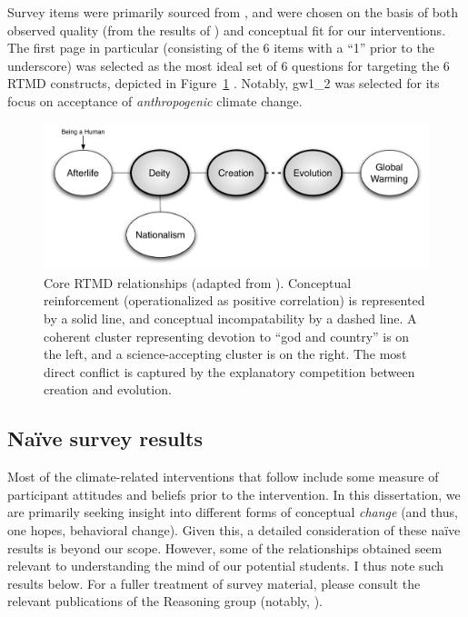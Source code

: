 Survey items were primarily sourced from \textcite{martinez_factors_2009}, and
were chosen on the basis of both observed quality (from the results of
\cite{martinez_factors_2009}) and conceptual fit for our interventions. The
first page in particular (consisting of the 6 items with a “1” prior to the
underscore) was selected as the most ideal set of 6 questions for targeting the
6 RTMD constructs, depicted in Figure~\ref{fig:rtmd}
\parencite{ranney_why_2012}.  Notably, \textsf{gw1_2} was selected for its focus
on acceptance of \emph{anthropogenic} climate change.

\begin{figure}
    \includegraphics[width=6.5in]{rtmd.pdf}
    \caption{Core RTMD relationships (adapted from \cite{ranney_why_2012}).
        Conceptual reinforcement (operationalized as positive correlation) is
        represented by a solid line, and conceptual incompatability by a dashed
        line. A coherent cluster representing devotion to “god and country” is
        on the left, and a science-accepting cluster is on the right. The most
        direct conflict is captured by the explanatory competition between
        creation and evolution.}
    \label{fig:rtmd}
\end{figure}

\subsection{Na\"ive survey results}

Most of the climate-related interventions that follow include some measure of
participant attitudes and beliefs prior to the intervention. In this
dissertation, we are primarily seeking insight into different forms of
conceptual \emph{change} (and thus, one hopes, behavioral change). Given this, a
detailed consideration of these na\"ive results is beyond our scope. However,
some of the relationships obtained seem relevant to understanding the mind of
our potential students. I thus note such results below. For a fuller treatment
of survey material, please consult the relevant publications of the Reasoning
group (notably, \cite{cohen_san_2012_f,ranney_changing_2012}).

